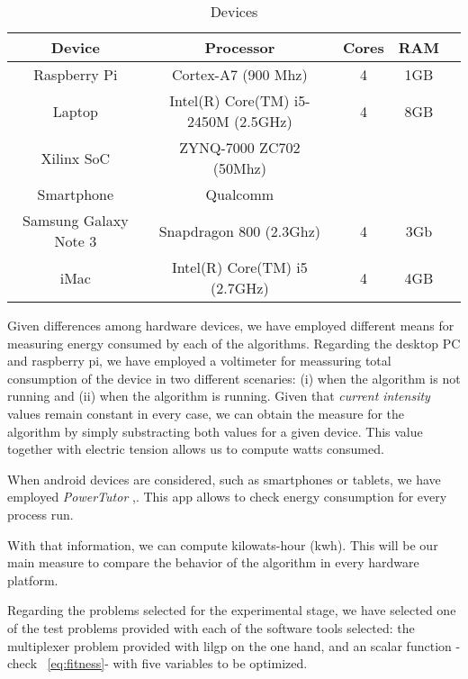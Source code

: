  
\begin{table}
\renewcommand{\arraystretch}{1.3}
\centering
\caption{Devices}
\label{Table:devices}
\begin{tabular}{ccccc} \hline
Device		&	Processor			&	Cores	&	RAM \\ \hline
Raspberry Pi	& Cortex-A7 (900 Mhz)	& 4 			&	1GB \\
Laptop 		& Intel(R) Core(TM) i5-2450M (2.5GHz)	&	4	&	8GB\\
Xilinx SoC 	& ZYNQ-7000 ZC702 (50Mhz) & 		& \\
Smartphone 	& Qualcomm 			& 			& \\
Samsung Galaxy Note 3 & Snapdragon 800 (2.3Ghz) & 4 & 3Gb \\
iMac			& Intel(R) Core(TM) i5  (2.7GHz)	& 4	& 4GB \\
\hline
\end{tabular}
\end{table}

Given differences among hardware devices, we have employed different means  %
for measuring energy consumed by each of the algorithms.  Regarding the desktop PC and raspberry pi, we have employed a voltimeter for meassuring total consumption of the device in two different scenaries:  (i) when the algorithm is not running and (ii) when the algorithm is running.  Given that \textit{current intensity} values remain constant in every case, we can obtain the measure for the algorithm by simply substracting both values for a given device.  This value together with electric tension allows us to compute watts consumed.

When android devices are considered, such as smartphones or tablets, we have employed  \textit{PowerTutor} \cite{powertutor},\cite{powertutor2}. This app allows to check energy consumption for every process run.

With that information, we can compute kilowats-hour (kwh).  This will be our main measure to compare the behavior of the algorithm in every hardware platform.


Regarding the problems selected for the experimental stage, we have selected one of the test problems provided with each of the software tools selected:  the multiplexer problem provided with lilgp on the one hand, and an scalar function -check ~\ref{eq:fitness}-  with five variables to be optimized. 

